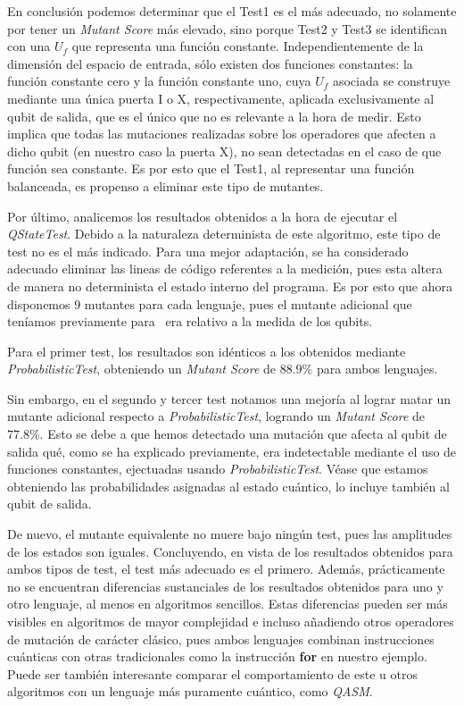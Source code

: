 En conclusión podemos determinar que el Test1 es el más adecuado, no solamente por tener un \textit{Mutant Score} más elevado, sino porque Test2 y Test3 se identifican con una $U_f$ que representa una función constante. Independientemente de la dimensión del espacio de entrada, sólo existen dos funciones constantes: la función constante cero y la función constante uno, cuya $U_f$ asociada se construye mediante una única puerta I o X, respectivamente, aplicada exclusivamente al qubit de salida, que es el único que no es relevante a la hora de medir. Esto implica que todas las mutaciones realizadas sobre los operadores que afecten a dicho qubit (en nuestro caso la puerta X), no sean detectadas en el caso de que función sea constante. Es por esto que el Test1, al representar una función balanceada, es propenso a eliminar este tipo de mutantes.

Por último, analicemos los resultados obtenidos a la hora de ejecutar el \textit{QStateTest}. Debido a la naturaleza determinista de este algoritmo, este tipo de test no es el más indicado. Para una mejor adaptación, se ha considerado adecuado eliminar las lineas de código referentes a la medición, pues esta altera de manera no determinista el estado interno del programa. Es por esto que ahora disponemos 9 mutantes para cada lenguaje, pues el mutante adicional que teníamos previamente para \qsh\ era relativo a la medida de los qubits.

Para el primer test, los resultados son idénticos a los obtenidos mediante \textit{ProbabilisticTest}, obteniendo un \textit{Mutant Score} de $88.9\%$ para ambos lenguajes.

Sin embargo, en el segundo y tercer test notamos una mejoría al lograr matar un mutante adicional respecto a \textit{ProbabilisticTest}, logrando un \textit{Mutant Score} de $77.8\%$. Esto se debe a que hemos detectado una mutación que afecta al qubit de salida qué, como se ha explicado previamente, era indetectable mediante el uso de funciones constantes, ejectuadas usando \textit{ProbabilisticTest}. Véase que estamos obteniendo las probabilidades asignadas al estado cuántico, lo incluye también al qubit de salida.

De nuevo, el mutante equivalente no muere bajo ningún test, pues las amplitudes de los estados son iguales. Concluyendo, en vista de los resultados obtenidos para ambos tipos de test, el test más adecuado es el primero. Además, prácticamente no se encuentran diferencias sustanciales de los resultados obtenidos para uno y otro lenguaje, al menos en algoritmos sencillos. Estas diferencias pueden ser más visibles en algoritmos de mayor complejidad e incluso añadiendo otros operadores de mutación de carácter clásico, pues ambos lenguajes combinan instrucciones cuánticas con otras tradicionales como la instrucción \textbf{for} en nuestro ejemplo. Puede ser también interesante comparar el comportamiento de este u otros algoritmos con un lenguaje más puramente cuántico, como 
\textit{QASM}.

